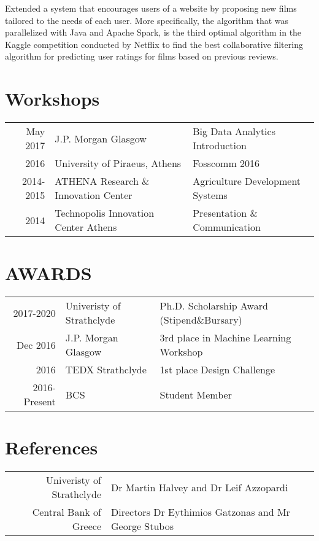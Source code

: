 \documentclass[]{deedy-resume-openfont}
\begin{document}
\begin{minipage}[t]{0.66\textwidth}
Extended a system that encourages users of a website by proposing new films tailored to the needs of each user. More specifically, the algorithm that was parallelized with Java and Apache Spark, is the third optimal algorithm in the Kaggle competition conducted by Netflix to find the best collaborative filtering algorithm for predicting user ratings for films based on previous reviews.
\sectionsep


\section{Workshops} 
\begin{tabular}{rll}
May 2017 & J.P. Morgan Glasgow & \textsuperscript{}  Big Data Analytics Introduction \\
2016 & University of Piraeus, Athens \textsuperscript  & Fosscomm 2016\\
2014-2015 & ATHENA Research \& Innovation Center & Agriculture Development Systems\\
2014	 & Technopolis Innovation Center Athens  & Presentation \& Communication \\
\end{tabular}
\sectionsep


\section{AWARDS} 
\begin{tabular}{rll}
2017-2020 	& Univeristy of Strathclyde    & Ph.D. Scholarship Award (Stipend\&Bursary) \\
Dec 2016   & J.P. Morgan Glasgow  & 3rd place in Machine Learning Workshop \\ 
2016   &  TEDX Strathclyde  & 1st place Design Challenge \\
2016-Present  &  BCS   & Student Member\\
\end{tabular}
\sectionsep

\section{References} 
\begin{tabular}{rll}
Univeristy of Strathclyde & Dr Martin Halvey and Dr Leif Azzopardi\\
Central Bank of Greece & Directors Dr Eythimios Gatzonas and Mr George Stubos 
\end{tabular}
\sectionsep


\end{minipage} 
\end{document}
